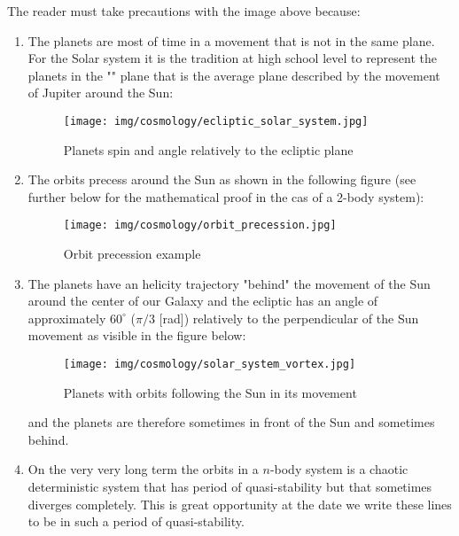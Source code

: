 	The reader must take precautions with the image above because:
	\begin{enumerate}
		\item The planets are most of time in a movement that is not in the same plane. For the Solar system it is the tradition  at high school level to represent the planets in the "" plane that is the average plane described by the movement of Jupiter around the Sun:
		\begin{figure}[H]
			\begin{center}
			\texttt{[image: img/cosmology/ecliptic\_solar\_system.jpg]}
			\end{center}	
			\caption{Planets spin and angle relatively to the ecliptic plane}
		\end{figure}
		
		\item The orbits precess around the Sun as shown in the following figure (see further below for the mathematical proof in the cas of a 2-body system):
		\begin{figure}[H]
			\begin{center}
			\texttt{[image: img/cosmology/orbit\_precession.jpg]}
			\end{center}	
			\caption{Orbit precession example}
		\end{figure}
		
		\item The planets have an helicity trajectory "behind" the movement of the Sun around the center of our Galaxy and the ecliptic has an angle of approximately $60^\circ$ ($\pi/3$ [rad]) relatively to the perpendicular of the Sun movement as visible in the figure below:
		\begin{figure}[H]
			\begin{center}
			\texttt{[image: img/cosmology/solar\_system\_vortex.jpg]}
			\end{center}	
			\caption{Planets with orbits following the Sun in its movement}
		\end{figure}
		and the planets are therefore sometimes in front of the Sun and sometimes behind.
		
		\item On the very very long term the orbits in a $n$-body system is a chaotic deterministic system that has period of quasi-stability but that sometimes diverges completely. This is great opportunity at the date we write these lines to be in such a period of quasi-stability.
	\end{enumerate}	
		

